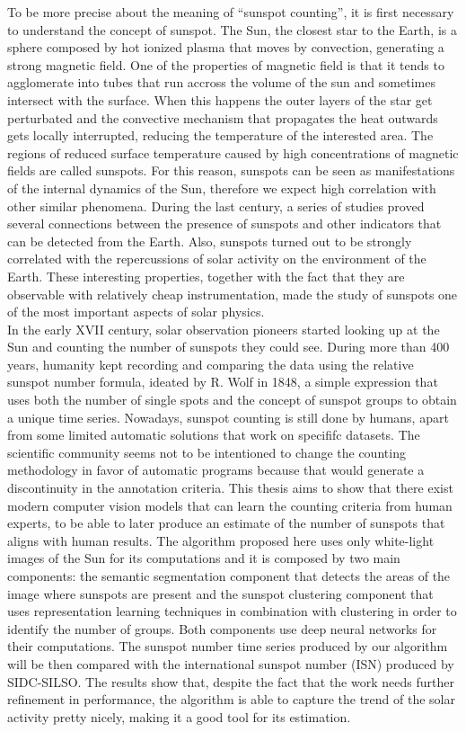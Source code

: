 To be more precise about the meaning of ``sunspot counting'', it is first necessary to understand the concept of sunspot. The Sun, the closest star to the Earth, is a sphere composed by hot ionized plasma that moves by convection, generating a strong magnetic field. One of the properties of magnetic field is that it tends to agglomerate into tubes that run accross the volume of the sun and sometimes intersect with the surface. When this happens the outer layers of the star get perturbated and the convective mechanism that propagates the heat outwards gets locally interrupted, reducing the temperature of the interested area. The regions of reduced surface temperature caused by high concentrations of magnetic fields are called sunspots. For this reason, sunspots can be seen as manifestations of the internal dynamics of the Sun, therefore we expect high correlation with other similar phenomena. During the last century, a series of studies proved several connections between the presence of sunspots and other indicators that can be detected from the Earth. Also, sunspots turned out to be strongly correlated with the repercussions of solar activity on the environment of the Earth. These interesting properties, together with the fact that they are observable with relatively cheap instrumentation, made the study of sunspots one of the most important aspects of solar physics.\\
In the early XVII century, solar observation pioneers started looking up at the Sun and counting the number of sunspots they could see. During more than 400 years, humanity kept recording and comparing the data using the relative sunspot number formula, ideated by R. Wolf in 1848, a simple expression that uses both the number of single spots and the concept of sunspot groups to obtain a unique time series. Nowadays, sunspot counting is still done by humans, apart from some limited automatic solutions that work on specififc datasets. The scientific community seems not to be intentioned to change the counting methodology in favor of automatic programs because that would generate a discontinuity in the annotation criteria. This thesis aims to show that there exist modern computer vision models that can learn the counting criteria from human experts, to be able to later produce an estimate of the number of sunspots that aligns with human results. The algorithm proposed here uses only white-light images of the Sun for its computations and it is composed by two main components: the semantic segmentation component that detects the areas of the image where sunspots are present and the sunspot clustering component that uses representation learning techniques in combination with clustering in order to identify the number of groups. Both components use deep neural networks for their computations. The sunspot number time series produced by our algorithm will be then compared with the international sunspot number (ISN) produced by SIDC-SILSO. The results show that, despite the fact that the work needs further refinement in performance, the algorithm is able to capture the trend of the solar activity pretty nicely, making it a good tool for its estimation.\\
